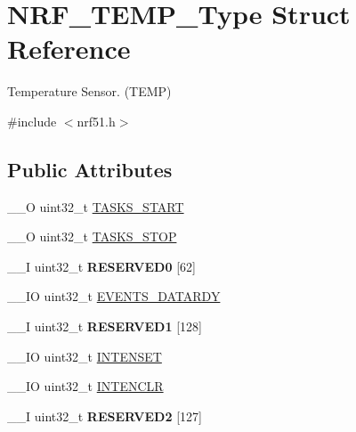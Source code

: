 \hypertarget{struct_n_r_f___t_e_m_p___type}{}\section{N\+R\+F\+\_\+\+T\+E\+M\+P\+\_\+\+Type Struct Reference}
\label{struct_n_r_f___t_e_m_p___type}


Temperature Sensor. (T\+E\+M\+P)  




{\ttfamily \#include $<$nrf51.\+h$>$}

\subsection*{Public Attributes}
\begin{DoxyCompactItemize}
\item 
\+\_\+\+\_\+\+O uint32\+\_\+t \hyperlink{struct_n_r_f___t_e_m_p___type_ab7a5adb84e61650cc625fbb33bd72282}{T\+A\+S\+K\+S\+\_\+\+S\+T\+A\+R\+T}
\item 
\+\_\+\+\_\+\+O uint32\+\_\+t \hyperlink{struct_n_r_f___t_e_m_p___type_a03d5391de4fe576876eb13605eac42d8}{T\+A\+S\+K\+S\+\_\+\+S\+T\+O\+P}
\item 
\hypertarget{struct_n_r_f___t_e_m_p___type_aecb014046500ded1072d61987f97e519}{}\+\_\+\+\_\+\+I uint32\+\_\+t {\bfseries R\+E\+S\+E\+R\+V\+E\+D0} \mbox{[}62\mbox{]}\label{struct_n_r_f___t_e_m_p___type_aecb014046500ded1072d61987f97e519}

\item 
\+\_\+\+\_\+\+I\+O uint32\+\_\+t \hyperlink{struct_n_r_f___t_e_m_p___type_a17e996b021410ca911c0dac530297618}{E\+V\+E\+N\+T\+S\+\_\+\+D\+A\+T\+A\+R\+D\+Y}
\item 
\hypertarget{struct_n_r_f___t_e_m_p___type_aa1d3c250946953143e2ed14747c9831b}{}\+\_\+\+\_\+\+I uint32\+\_\+t {\bfseries R\+E\+S\+E\+R\+V\+E\+D1} \mbox{[}128\mbox{]}\label{struct_n_r_f___t_e_m_p___type_aa1d3c250946953143e2ed14747c9831b}

\item 
\+\_\+\+\_\+\+I\+O uint32\+\_\+t \hyperlink{struct_n_r_f___t_e_m_p___type_aee53e0bad0d07665902ff486ef9a86a2}{I\+N\+T\+E\+N\+S\+E\+T}
\item 
\+\_\+\+\_\+\+I\+O uint32\+\_\+t \hyperlink{struct_n_r_f___t_e_m_p___type_a6e21761bc105f3ff5834c55097c7b130}{I\+N\+T\+E\+N\+C\+L\+R}
\item 
\hypertarget{struct_n_r_f___t_e_m_p___type_a39bc98b9c840d38e12f9cd8aac788a40}{}\+\_\+\+\_\+\+I uint32\+\_\+t {\bfseries R\+E\+S\+E\+R\+V\+E\+D2} \mbox{[}127\mbox{]}\label{struct_n_r_f___t_e_m_p___type_a39bc98b9c840d38e12f9cd8aac788a40}


\end{DoxyCompactItemize}

